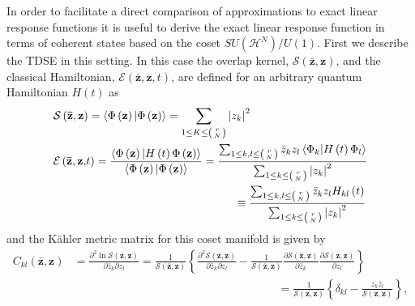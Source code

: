 \documentclass[aps,preprint]{revtex4}%
\begin{document}
In order to facilitate a direct comparison of approximations to exact linear
response functions it is useful to derive the exact linear response function
in terms of coherent states based on the coset $SU\left(  \mathcal{H}%
^{N}\right)  /U\left(  1\right)  $. First we describe the TDSE in this
setting. In this case the overlap kernel, $\mathcal{S}\left(
\mathbf{\mathbf{\bar{z}},\mathbf{z}}\right)  $, and the classical Hamiltonian,
$\mathcal{E}\left(  \mathbf{\mathbf{\bar{z}},\mathbf{z},}t\right)  $, are
defined for an arbitrary quantum Hamiltonian $H\left(  t\right)  $ as%
\begin{align}
&  \mathcal{S}\left(  \mathbf{\mathbf{\bar{z}},\mathbf{z}}\right)
=\left\langle \Phi\left(  \mathbf{z}\right)  \mathbf{|}\Phi\left(
\mathbf{z}\right)  \right\rangle =\sum_{1\leq K\leq\left(
\genfrac{}{}{0pt}{}{r}{N}%
\right)  }\left\vert z_{k}\right\vert ^{2}\nonumber\\
&  \mathcal{E}\left(  \mathbf{\mathbf{\bar{z}},\mathbf{z},}t\right)
=\frac{\left\langle \Phi\left(  \mathbf{z}\right)  \mathbf{|}H\left(
t\right)  \Phi\left(  \mathbf{z}\right)  \right\rangle }{\left\langle
\Phi\left(  \mathbf{z}\right)  \mathbf{|}\Phi\left(  \mathbf{z}\right)
\right\rangle }=\frac{\sum_{1\leq k,l\leq\left(
\genfrac{}{}{0pt}{}{r}{N}%
\right)  }\bar{z}_{k}z_{l}\left\langle \Phi_{k}\mathbf{|}H\left(  t\right)
\Phi_{l}\right\rangle }{\sum_{1\leq k\leq\left(
\genfrac{}{}{0pt}{}{r}{N}%
\right)  }\left\vert z_{k}\right\vert ^{2}}\nonumber\\
&  \qquad\qquad\qquad\qquad\qquad\qquad\qquad\qquad\equiv\frac{\sum_{1\leq
k,l\leq\left(
\genfrac{}{}{0pt}{}{r}{N}%
\right)  }\bar{z}_{k}z_{l}H_{kl}\left(  t\right)  }{\sum_{1\leq k\leq\left(
\genfrac{}{}{0pt}{}{r}{N}%
\right)  }\left\vert z_{k}\right\vert ^{2}}%
\end{align}
and the K\"{a}hler metric matrix for this coset manifold is given by
\begin{align}
C_{kl}\left(  \mathbf{\mathbf{\bar{z}},\mathbf{z}}\right)   &  =\frac
{\partial^{2}\ln\mathcal{S}\left(  \mathbf{\mathbf{\bar{z}},\mathbf{z}%
}\right)  }{\partial\bar{z}_{k}\partial z_{l}}=\frac{1}{\mathcal{S}\left(
\mathbf{\mathbf{\bar{z}},\mathbf{z}}\right)  }\left\{  \frac{\partial
^{2}\mathcal{S}\left(  \mathbf{\mathbf{\bar{z}},\mathbf{z}}\right)  }%
{\partial\bar{z}_{k}\partial z_{l}}-\frac{1}{\mathcal{S}\left(
\mathbf{\mathbf{\bar{z}},\mathbf{z}}\right)  }\frac{\partial\mathcal{S}\left(
\mathbf{\mathbf{\bar{z}},\mathbf{z}}\right)  }{\partial\bar{z}_{k}}%
\frac{\partial\mathcal{S}\left(  \mathbf{\mathbf{\bar{z}},\mathbf{z}}\right)
}{\partial z_{l}}\right\} \nonumber\\
&  \qquad\qquad\qquad\qquad\qquad\qquad\qquad\qquad\qquad\left.  =\right.
\frac{1}{\mathcal{S}\left(  \mathbf{\mathbf{\bar{z}},\mathbf{z}}\right)
}\left\{  \delta_{kl}-\frac{z_{k}\bar{z}_{l}}{\mathcal{S}\left(
\mathbf{\mathbf{\bar{z}},\mathbf{z}}\right)  }\right\}  ,
\end{align}
\end{document}
